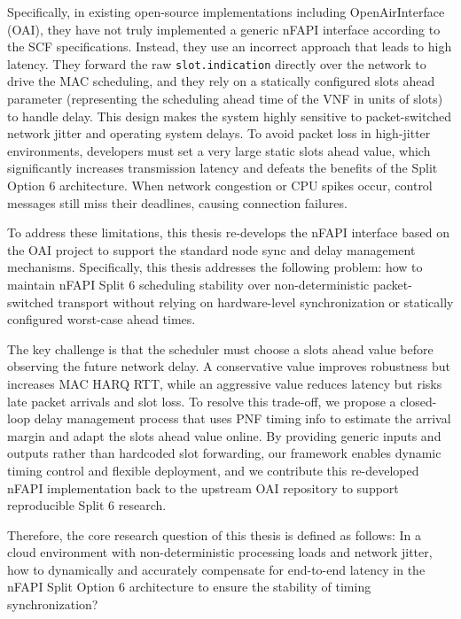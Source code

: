 \documentclass[../my_ntust_thesis.tex]{subfiles}
\begin{document}
Specifically, in existing open-source implementations including OpenAirInterface (OAI), they have not truly implemented a generic nFAPI interface according to the SCF specifications. Instead, they use an incorrect approach that leads to high latency. They forward the raw \texttt{slot.indication} directly over the network to drive the MAC scheduling, and they rely on a statically configured slots ahead parameter (representing the scheduling ahead time of the VNF in units of slots) to handle delay. This design makes the system highly sensitive to packet-switched network jitter and operating system delays. To avoid packet loss in high-jitter environments, developers must set a very large static slots ahead value, which significantly increases transmission latency and defeats the benefits of the Split Option 6 architecture. When network congestion or CPU spikes occur, control messages still miss their deadlines, causing connection failures.

To address these limitations, this thesis re-develops the nFAPI interface based on the OAI project to support the standard node sync and delay management mechanisms. Specifically, this thesis addresses the following problem: how to maintain nFAPI Split 6 scheduling stability over non-deterministic packet-switched transport without relying on hardware-level synchronization or statically configured worst-case ahead times.

The key challenge is that the scheduler must choose a slots ahead value before observing the future network delay. A conservative value improves robustness but increases MAC HARQ RTT, while an aggressive value reduces latency but risks late packet arrivals and slot loss. To resolve this trade-off, we propose a closed-loop delay management process that uses PNF timing info to estimate the arrival margin and adapt the slots ahead value online. By providing generic inputs and outputs rather than hardcoded slot forwarding, our framework enables dynamic timing control and flexible deployment, and we contribute this re-developed nFAPI implementation back to the upstream OAI repository to support reproducible Split 6 research.

Therefore, the core research question of this thesis is defined as follows: In a cloud environment with non-deterministic processing loads and network jitter, how to dynamically and accurately compensate for end-to-end latency in the nFAPI Split Option 6 architecture to ensure the stability of timing synchronization?

\end{document}
